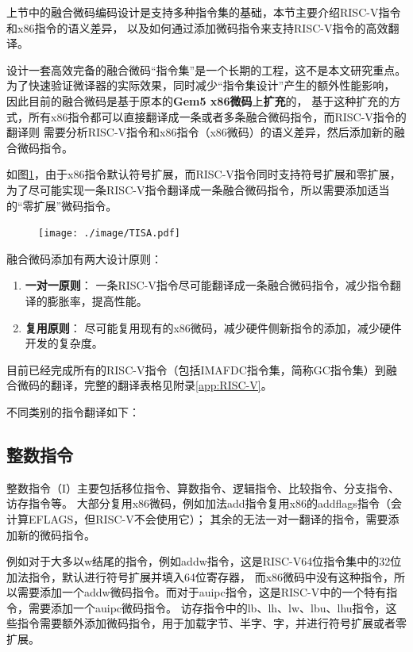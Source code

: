 上节中的融合微码编码设计是支持多种指令集的基础，本节主要介绍RISC-V指令和x86指令的语义差异，
以及如何通过添加微码指令来支持RISC-V指令的高效翻译。

设计一套高效完备的融合微码“指令集”是一个长期的工程，这不是本文研究重点。
为了快速验证微译器的实际效果，同时减少“指令集设计”产生的额外性能影响，
因此目前的融合微码是基于原本的\textbf{Gem5 x86微码}上\textbf{扩充}的，
基于这种扩充的方式，所有x86指令都可以直接翻译成一条或者多条融合微码指令，而RISC-V指令的翻译则
需要分析RISC-V指令和x86指令（x86微码）的语义差异，然后添加新的融合微码指令。

如图\ref{img:TISA}，由于x86指令默认符号扩展，而RISC-V指令同时支持符号扩展和零扩展，
为了尽可能实现一条RISC-V指令翻译成一条融合微码指令，所以需要添加适当的“零扩展”微码指令。

\begin{figure}[!htbp]
  \centering
  \texttt{[image: ./image/TISA.pdf]}
  \label{img:TISA}
\end{figure}

融合微码添加有两大设计原则：
\begin{enumerate}
  \item \textbf{一对一原则}： 一条RISC-V指令尽可能翻译成一条融合微码指令，减少指令翻译的膨胀率，提高性能。
  \item \textbf{复用原则}： 尽可能复用现有的x86微码，减少硬件侧新指令的添加，减少硬件开发的复杂度。
\end{enumerate}

目前已经完成所有的RISC-V指令（包括IMAFDC指令集，简称GC指令集）到融合微码的翻译，完整的翻译表格见附录\ref{app:RISC-V}。

不同类别的指令翻译如下：

\subsection{整数指令}
整数指令（I）主要包括移位指令、算数指令、逻辑指令、比较指令、分支指令、访存指令等。
大部分复用x86微码，例如加法add指令复用x86的addflags指令（会计算EFLAGS，但RISC-V不会使用它）；
其余的无法一对一翻译的指令，需要添加新的微码指令。

例如对于大多以w结尾的指令，例如addw指令，这是RISC-V64位指令集中的32位加法指令，默认进行符号扩展并填入64位寄存器，
而x86微码中没有这种指令，所以需要添加一个addw微码指令。而对于auipc指令，这是RISC-V中的一个特有指令，需要添加一个auipc微码指令。
访存指令中的lb、lh、lw、lbu、lhu指令，这些指令需要额外添加微码指令，用于加载字节、半字、字，并进行符号扩展或者零扩展。

